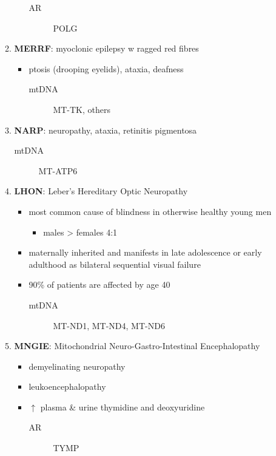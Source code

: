 \documentclass[12pt]{scrartcl}
\begin{document}
\begin{enumerate}
\begin{enumerate}
\begin{itemize}
\begin{description}
\item[{AR}] POLG
\end{description}
\end{itemize}
\item \textbf{MERRF}: myoclonic epilepsy w ragged red fibres
\label{sec:org888ef4b}
\begin{itemize}
\item ptosis (drooping eyelids), ataxia, deafness
\begin{description}
\item[{mtDNA}] MT-TK, others
\end{description}
\end{itemize}
\item \textbf{NARP}: neuropathy, ataxia, retinitis pigmentosa
\label{sec:org6e03273}
\begin{description}
\item[{mtDNA}] MT-ATP6
\end{description}
\item \textbf{LHON}: Leber’s Hereditary Optic Neuropathy
\label{sec:org8ea05a6}
\begin{itemize}
\item most common cause of blindness in otherwise healthy young men
\begin{itemize}
\item males \textgreater{} females 4:1
\end{itemize}
\item maternally inherited and manifests in late adolescence or early
adulthood as bilateral sequential visual failure
\item 90\% of patients are affected by age 40
\begin{description}
\item[{mtDNA}] MT-ND1, MT-ND4, MT-ND6
\end{description}
\end{itemize}
\item \textbf{MNGIE}: Mitochondrial Neuro-Gastro-Intestinal Encephalopathy
\label{sec:orgd9365e0}
\begin{itemize}
\item demyelinating neuropathy
\item leukoencephalopathy
\item \(\uparrow\) plasma \& urine thymidine and deoxyuridine
\begin{description}
\item[{AR}] TYMP
\end{description}
\end{itemize}

\end{enumerate}
\end{enumerate}
\end{document}

